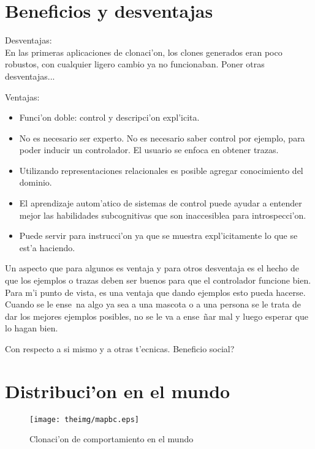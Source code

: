 \documentclass[11pt]{article}
\begin{document}
\section{Beneficios y desventajas}

Desventajas:\\
En las primeras aplicaciones de clonaci'on, los clones generados eran poco robustos, con cualquier ligero cambio ya no funcionaban. Poner otras desventajas...

Ventajas:
\begin{itemize}
\item Funci'on doble: control y descripci'on expl'icita.
\item No es necesario ser experto. No es necesario saber control por ejemplo, para poder inducir un controlador. El usuario se enfoca en obtener trazas.
\item Utilizando representaciones relacionales es posible agregar conocimiento del dominio.
\item El aprendizaje autom'atico de sistemas de control puede ayudar a entender mejor las habilidades subcognitivas que son inaccesiblea para introspecci'on.
\item Puede servir para instrucci'on ya que se muestra expl'icitamente lo que se est'a haciendo.
\end{itemize}

Un aspecto que para algunos es ventaja y para otros desventaja es el hecho de que los ejemplos o trazas deben ser buenos para que el controlador funcione bien. Para m'i punto de vista, es una ventaja que dando ejemplos esto pueda hacerse. Cuando se le ense~na algo ya sea a una mascota o a una persona se le trata de dar los mejores ejemplos posibles, no se le va a ense~ñar mal y luego esperar que lo hagan bien. 

Con respecto a si mismo y a otras t'ecnicas. Beneficio social?
\section{Distribuci'on en el mundo}

\begin{figure}[h]

\centering

\texttt{[image: theimg/mapbc.eps]}

\caption[Clonaci'on de comportamiento en el mundo]{Clonaci'on de comportamiento en el mundo} 
\label{fig:bcmapa}

\end{figure}



\end{document}
